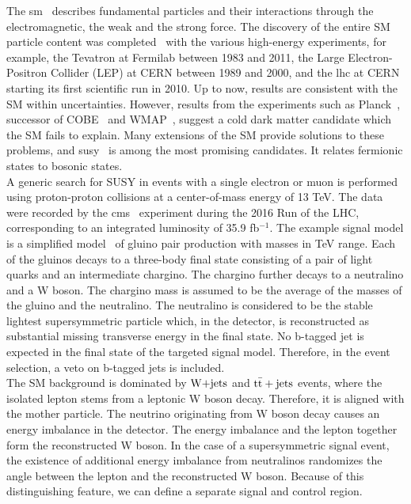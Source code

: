 The \acrfull{sm}~\cite{glashow,salam,weinberg,higgs1,higgs2} describes fundamental particles and their interactions through the electromagnetic, the weak and the strong force. The discovery of the entire SM particle content was completed~\cite{top1,top2,higgsexp1,higgsexp2,higgsexp3} with the various high-energy experiments, for example, the Tevatron at Fermilab between 1983 and 2011, the Large Electron-Positron Collider (LEP) at CERN between 1989 and 2000, and the \acrfull{lhc} at CERN starting its first scientific run in 2010. Up to now, results are consistent with the SM within uncertainties. However, results from the experiments such as Planck~\cite{DM5}, successor of COBE~\cite{DM4} and WMAP~\cite{DM3}, suggest a cold dark matter candidate which the SM fails to explain. Many extensions of the SM provide solutions to these problems, and \acrfull{susy}~\cite{Psusy1,Psusy2,Psusy3,Psusy4,Psusy5,Psusy6,Psusy7,Psusy8} is among the most promising candidates. It relates fermionic states to bosonic states.\\
A generic search for SUSY in events with a single electron or muon is performed using proton-proton collisions at a center-of-mass energy of 13 TeV. The data were recorded by the \acrfull{cms}~\cite{CMS_exp} experiment during the 2016 Run of the LHC, corresponding to an integrated luminosity of 35.9 fb$^{-1}$. The example signal model is a simplified model~\cite{Psms1,Psms2,Psms3,Psms4} of gluino pair production with masses in TeV range. Each of the gluinos decays to a three-body final state consisting of a pair of light quarks and an intermediate chargino. The chargino further decays to a neutralino and a W boson. The chargino mass is assumed to be the average of the masses of the gluino and the neutralino. The neutralino is considered to be the stable lightest supersymmetric particle which, in the detector, is reconstructed as substantial missing transverse energy in the final state. No b-tagged jet is expected in the final state of the targeted signal model. Therefore, in the event selection, a veto on b-tagged jets is included.\\
The SM background is dominated by $\textrm{W+jets}$ and ${\rm t\bar{t}+jets}$ events, where the isolated lepton stems from a leptonic W boson decay. Therefore, it is aligned with the mother particle. The neutrino originating from W boson decay causes an energy imbalance in the detector. The energy imbalance and the lepton together form the reconstructed W boson. In the case of a supersymmetric signal event, the existence of additional energy imbalance from neutralinos randomizes the angle between the lepton and the reconstructed W boson. Because of this distinguishing feature, we can define a separate signal and control region.\\
